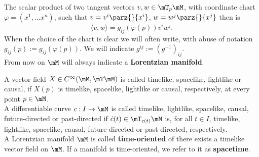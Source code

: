 The scalar product of two tangent vectors $v,w\in\mT_p\mM$, with coordinate chart $\varphi=(x^1,\dots x^n)$, such that $v=v^i\parz{ }{x^i}$, $w=w^j\parz{ }{x^j}$ then is
\[ \langle v,w\rangle=g_{ij}(\varphi(p))v^iw^j.   \]
When the choice of the chart is clear we will often write, with abuse of notation $g_{ij}(p):=g_{ij}(\varphi(p))$. We will indicate $g^{ij}:=(g^{-1})_{ij}$.\\

From now on $\mM$ will always indicate a \textbf{Lorentzian manifold}.

\begin{definition}
		A vector field $X\in C^\infty (\mM,\mT\mM)$ is called timelike, spacelike, lightlike or causal, if $X (p)$ is timelike, spacelike, lightlike or causal, respectively, at every point $p\in\mM$.\\
		
		A differentiable curve $c : I\to\mM$ is called timelike, lightlike,
		spacelike, causal, future-directed or past-directed if $\dot{c}(t)\in\mT_{c(t)}\mM$ is, for all $t\in I$, timelike, lightlike, spacelike, causal,
		future-directed or past-directed, respectively.\\
		
		A Lorentzian manifold $\mM$ is called \textbf{time-oriented} of there exists a timelike vector field on $\mM$. If a manifold is time-oriented, we refer to it as \textbf{spacetime}.
\end{definition}


